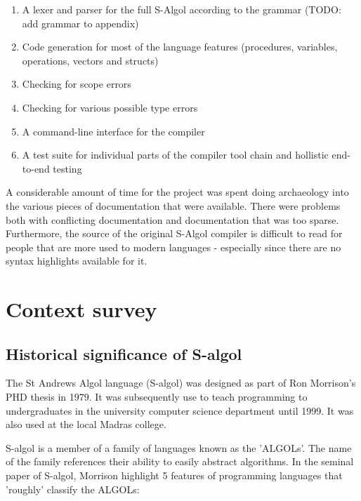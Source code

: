 \documentclass{article}
\begin{document}
\begin{enumerate}
\item A lexer and parser for the full S-Algol according to the grammar (TODO: add grammar to appendix)
\item Code generation for most of the language features (procedures, variables, operations, vectors and structs)
\item Checking for scope errors
\item Checking for various possible type errors
\item A command-line interface for the compiler
\item A test suite for individual parts of the compiler tool chain and hollistic end-to-end testing
\end{enumerate}

A considerable amount of time for the project was spent doing archaeology into the various pieces of documentation that were available. There were problems both with conflicting documentation and documentation that was too sparse. Furthermore, the source of the original S-Algol compiler is difficult to read for people that are more used to modern languages - especially since there are no syntax highlights available for it.


\section{Context survey}

\subsection{Historical significance of S-algol}

The St Andrews Algol language (S-algol) was designed as part of Ron Morrison's PHD thesis in 1979. It was subsequently use to teach programming to undergraduates in the university computer science department until 1999. It was also used at the local Madras college.

S-algol is a member of a family of languages known as the 'ALGOLs'. The name of the family references their ability to easily abstract algorithms. In the seminal paper of S-algol, Morrison highlight 5 features of programming languages that 'roughly' classify the ALGOLs:
\end{document}
